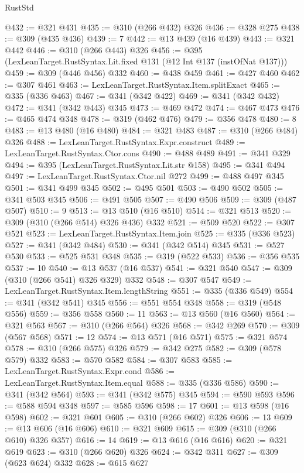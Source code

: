 \begin{lexlean}{RustStd}
\begin{coremodule}
@432 := @321 @431
@435 := @310 (@266 @432) @326
@436 := @328 @275
@438 := @309 (@435 @436)
@439 := 7
@442 := @13 @439 (@16 @439)
@443 := @321 @442
@446 := @310 (@266 @443) @326
@456 := @395 (LexLeanTarget.RustSyntax.Lit.fixed @131 (@12 Int @137 (instOfNat @137)))
@459 := @309 (@446 @456) @332
@460 := @438 @459
@461 := @427 @460
@462 := @307 @461
@463 := LexLeanTarget.RustSyntax.Item.splitExact
@465 := @335 (@336 @463)
@467 := @341 (@342 @422)
@469 := @341 (@342 @432)
@472 := @341 (@342 @443) @345
@473 := @469 @472
@474 := @467 @473
@476 := @465 @474 @348
@478 := @319 (@462 @476)
@479 := @356 @478
@480 := 8
@483 := @13 @480 (@16 @480)
@484 := @321 @483
@487 := @310 (@266 @484) @326
@488 := LexLeanTarget.RustSyntax.Expr.construct
@489 := LexLeanTarget.RustSyntax.Ctor.cons
@490 := @488 @489
@491 := @341 @329
@494 := @395 (LexLeanTarget.RustSyntax.Lit.str @158)
@495 := @341 @494
@497 := LexLeanTarget.RustSyntax.Ctor.nil @272
@499 := @488 @497 @345
@501 := @341 @499 @345
@502 := @495 @501
@503 := @490 @502
@505 := @341 @503 @345
@506 := @491 @505
@507 := @490 @506
@509 := @309 (@487 @507)
@510 := 9
@513 := @13 @510 (@16 @510)
@514 := @321 @513
@520 := @309 (@310 (@266 @514) @326 @436) @332
@521 := @509 @520
@522 := @307 @521
@523 := LexLeanTarget.RustSyntax.Item.join
@525 := @335 (@336 @523)
@527 := @341 (@342 @484)
@530 := @341 (@342 @514) @345
@531 := @527 @530
@533 := @525 @531 @348
@535 := @319 (@522 @533)
@536 := @356 @535
@537 := 10
@540 := @13 @537 (@16 @537)
@541 := @321 @540
@547 := @309 (@310 (@266 @541) @326 @329) @332
@548 := @307 @547
@549 := LexLeanTarget.RustSyntax.Item.lengthString
@551 := @335 (@336 @549)
@554 := @341 (@342 @541) @345
@556 := @551 @554 @348
@558 := @319 (@548 @556)
@559 := @356 @558
@560 := 11
@563 := @13 @560 (@16 @560)
@564 := @321 @563
@567 := @310 (@266 @564) @326
@568 := @342 @269
@570 := @309 (@567 @568)
@571 := 12
@574 := @13 @571 (@16 @571)
@575 := @321 @574
@578 := @310 (@266 @575) @326
@579 := @342 @275
@582 := @309 (@578 @579) @332
@583 := @570 @582
@584 := @307 @583
@585 := LexLeanTarget.RustSyntax.Expr.cond
@586 := LexLeanTarget.RustSyntax.Item.equal
@588 := @335 (@336 @586)
@590 := @341 (@342 @564)
@593 := @341 (@342 @575) @345
@594 := @590 @593
@596 := @588 @594 @348
@597 := @585 @596
@598 := 17
@601 := @13 @598 (@16 @598)
@602 := @321 @601
@605 := @310 (@266 @602) @326
@606 := 13
@609 := @13 @606 (@16 @606)
@610 := @321 @609
@615 := @309 (@310 (@266 @610) @326 @357)
@616 := 14
@619 := @13 @616 (@16 @616)
@620 := @321 @619
@623 := @310 (@266 @620) @326
@624 := @342 @311
@627 := @309 (@623 @624) @332
@628 := @615 @627

\end{coremodule}
\end{lexlean}
